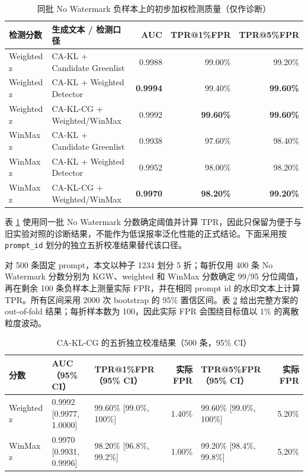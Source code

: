 \documentclass[a4paper,UTF8,zihao=5]{ctexart}
\newcommand{\method}{CA-KL}
\newcommand{\fullmethod}{CA-KL-CG}
\begin{document}
\begin{table}[H]
    \centering
    \caption{同批 No Watermark 负样本上的初步加权检测质量（仅作诊断）}
    \label{tab:auc}
    \scriptsize
    \setlength{\tabcolsep}{2.5pt}
    \begin{tabularx}{\textwidth}{p{}p{}rrr}
        \toprule
        检测分数       & 生成文本 / 检测口径                     & AUC             & TPR@1\%FPR       & TPR@5\%FPR       \\
        \midrule
        Weighted z & CA-KL + Candidate Greenlist     & 0.9988          & 99.00\%          & 99.20\%          \\
        Weighted z & \method{} + Weighted Detector   & \textbf{0.9994} & 99.40\%          & \textbf{99.60\%} \\
        Weighted z & \fullmethod{} + Weighted/WinMax & 0.9992          & \textbf{99.60\%} & \textbf{99.60\%} \\
        WinMax z   & CA-KL + Candidate Greenlist     & 0.9938          & 97.60\%          & 98.40\%          \\
        WinMax z   & \method{} + Weighted Detector   & 0.9952          & 98.00\%          & 98.20\%          \\
        WinMax z   & \fullmethod{} + Weighted/WinMax & \textbf{0.9970} & \textbf{98.20\%} & \textbf{99.20\%} \\
        \bottomrule
    \end{tabularx}
\end{table}

表 \ref{tab:auc} 使用同一批 No Watermark 分数确定阈值并计算 TPR，因此只保留为便于与旧实验对照的诊断结果，不能作为低误报率泛化性能的正式结论。下面采用按 \texttt{prompt\_id} 划分的独立五折校准结果替代该口径。

对 500 条固定 prompt，本文以种子 1234 划分 5 折；每折仅用 400 条 No Watermark 分数分别为 KGW、weighted 和 WinMax 分数确定 99/95 分位阈值，再在剩余 100 条负样本上测量实际 FPR，并在相同 prompt id 的水印文本上计算 TPR。所有区间采用 2000 次 bootstrap 的 95\% 置信区间。表 \ref{tab:calibrated-final} 给出完整方案的 out-of-fold 结果；每折样本数为 100，因此实际 FPR 会围绕目标值以 1\% 的离散粒度波动。

\begin{table}[H]
    \centering
    \caption{\fullmethod{} 的五折独立校准结果（500 条，95\% CI）}
    \label{tab:calibrated-final}
    \scriptsize
    \setlength{\tabcolsep}{3pt}
    \begin{tabularx}{\textwidth}{p{}p{}p{}rp{}r}
        \toprule
        分数 & AUC（95\% CI） & TPR@1\%FPR（95\% CI） & 实际 FPR & TPR@5\%FPR（95\% CI） & 实际 FPR \\
        \midrule
        Weighted z & 0.9992 [0.9977, 1.0000] & 99.60\% [99.0\%, 100\%] & 1.40\% & 99.60\% [99.0\%, 100\%] & 5.20\% \\
        WinMax z & 0.9970 [0.9931, 0.9996] & 98.20\% [96.8\%, 99.2\%] & 1.00\% & 99.20\% [98.4\%, 99.8\%] & 5.20\% \\
        \bottomrule
    \end{tabularx}
\end{table}
\end{document}

